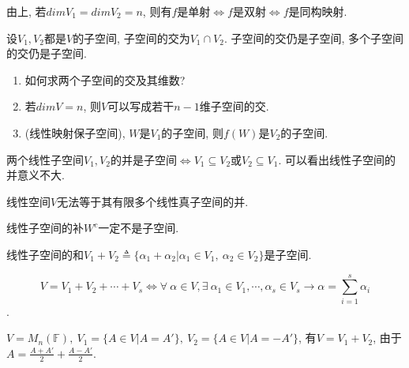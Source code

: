 \begin{inference}
    由上, 若$dimV_1=dimV_2=n$, 则有$f$是单射$\Longleftrightarrow$$f$是双射$\Longleftrightarrow$$f$是同构映射.
\end{inference}

\begin{statement}[子空间的交]
    设$V_1, V_2$都是$V$的子空间, 子空间的交为$V_1\cap V_2$.
    子空间的交仍是子空间, 多个子空间的交仍是子空间.
\end{statement}

\begin{example}
    \begin{enumerate}[itemindent=1em]
        \item 如何求两个子空间的交及其维数?
        \item 若$dimV=n$, 则$V$可以写成若干$n-1$维子空间的交.
        \item (线性映射保子空间), $W$是$V_1$的子空间, 则$f(W)$是$V_2$的子空间.
    \end{enumerate}
\end{example}

\begin{lemma}[子空间的并]
    两个线性子空间$V_1, V_2$的并是子空间$\Longleftrightarrow$$V_1\subseteq V_2$或$V_2\subseteq V_1$.
    可以看出线性子空间的并意义不大.
\end{lemma}

\begin{theorem}
    线性空间$V$无法等于其有限多个线性真子空间的并.
\end{theorem}

\begin{statement}
    线性子空间的补$W^c$一定不是子空间.
\end{statement}

\begin{lemma}
    线性子空间的和$V_1+V_2\triangleq{\{\alpha{_1}+\alpha{_2}|\alpha{_1}\in V_1, \ \alpha{_2}\in V_2\}}$是子空间.
\end{lemma}

\begin{example}
    \[V=V_1+V_2+\cdots+V_s\Longleftrightarrow \forall \ \alpha \in V, \exists \ \alpha{_1}\in V_1, \cdots, \alpha{_s}\in V_s\to\alpha=\sum^s_{i=1}\alpha{_i}\].
\end{example}

\begin{example}
    $V=M_n(\mathbb{F}), \ V_1=\{A\in V|A=A'\}, \ V_2=\{A\in V|A=-A'\}$, 有$V=V_1+V_2$, 由于$A=\frac{A+A'}{2}+\frac{A-A'}{2}$.
\end{example}

